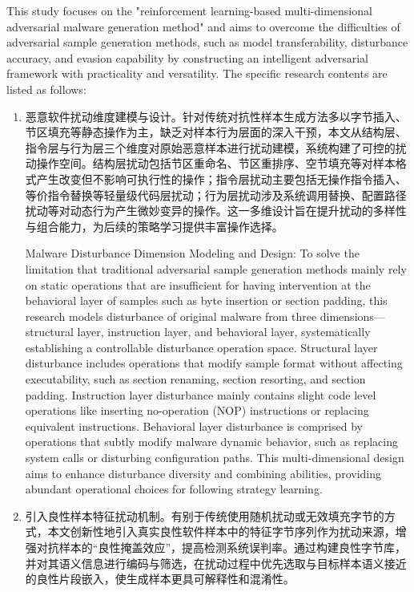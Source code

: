 This study focuses on the "reinforcement learning-based multi-dimensional adversarial malware generation method" and aims to overcome the difficulties of adversarial sample generation methods, such as model transferability, disturbance accuracy, and evasion capability by constructing an intelligent adversarial framework with practicality and versatility. The specific research contents are listed as follows:
\begin{enumerate} [label=\arabic*)] 
\item 恶意软件扰动维度建模与设计。针对传统对抗性样本生成方法多以字节插入、节区填充等静态操作为主，缺乏对样本行为层面的深入干预，本文从结构层、指令层与行为层三个维度对原始恶意样本进行扰动建模，系统构建了可控的扰动操作空间。结构层扰动包括节区重命名、节区重排序、空节填充等对样本格式产生改变但不影响可执行性的操作；指令层扰动主要包括无操作指令插入、等价指令替换等轻量级代码层扰动；行为层扰动涉及系统调用替换、配置路径扰动等对动态行为产生微妙变异的操作。这一多维设计旨在提升扰动的多样性与组合能力，为后续的策略学习提供丰富操作选择。

Malware Disturbance Dimension Modeling and Design: To solve the limitation that traditional adversarial sample generation methods mainly rely on static operations that are insufficient for having intervention at the behavioral layer of samples such as byte insertion or section padding, this research models disturbance of original malware from three dimensions—structural layer, instruction layer, and behavioral layer, systematically establishing a controllable disturbance operation space. Structural layer disturbance includes operations that modify sample format without affecting executability, such as section renaming, section resorting, and section padding. Instruction layer disturbance mainly contains slight code level operations like inserting no-operation (NOP) instructions or replacing equivalent instructions. Behavioral layer disturbance is comprised by operations that subtly modify malware dynamic behavior, such as replacing system calls or disturbing configuration paths. This multi-dimensional design aims to enhance disturbance diversity and combining abilities, providing abundant operational choices for following strategy learning.
\item 引入良性样本特征扰动机制。有别于传统使用随机扰动或无效填充字节的方式，本文创新性地引入真实良性软件样本中的特征字节序列作为扰动来源，增强对抗样本的“良性掩盖效应”，提高检测系统误判率。通过构建良性字节库，并对其语义信息进行编码与筛选，在扰动过程中优先选取与目标样本语义接近的良性片段嵌入，使生成样本更具可解释性和混淆性。


\end{enumerate}

